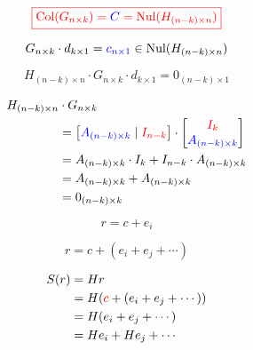 \begin{frame}
  \[
	\textcolor{red}{\boxed{\text{Col}(G_{n \times k}) = \textcolor{blue}{C} = \text{Nul}(H_{(n-k) \times n})}}
  \]

  \pause
  \[
	G_{n \times k} \cdot d_{k \times 1} = \textcolor{blue}{c_{n \times 1}} \in \text{Nul}(H_{(n-k) \times n})
  \]

  \pause
  \[
	H_{(n-k) \times n} \cdot G_{n \times k} \cdot d_{k \times 1} = 0_{(n-k) \times 1}
  \]

  \pause
  \begin{align*}
	H_{(n-k) \times n} &\cdot G_{n \times k} \\
	&= \begin{bmatrix}
	  \textcolor{blue}{A_{(n-k) \times k}} \mid \textcolor{red}{I_{n-k}}
	\end{bmatrix}
	\cdot
	\begin{bmatrix}
	  \textcolor{red}{I_k} \\ \textcolor{blue}{A_{(n-k) \times k}}
	\end{bmatrix} \\
	&= A_{(n-k) \times k} \cdot I_k + I_{n-k} \cdot A_{(n-k) \times k} \\
	&= A_{(n-k) \times k} + A_{(n-k) \times k} \\
	&= 0_{(n-k) \times k}
  \end{align*}
\end{frame}

\begin{frame}
  \[
	r = c + e_i
  \]

  \[
	r = c + (e_{i} + e_{j} + \cdots)
  \]

  \pause
  \begin{definition}[Syndrome]
	\begin{align*}
	  S(r) &= H r \\
		&= H(\textcolor{red}{c} + (e_{i} + e_{j} + \cdots)) \\
		&= H (e_{i} + e_{j} + \cdots) \\
		&= H e_{i} + H e_{j} + \cdots \\
	\end{align*}
  \end{definition}
\end{frame}

